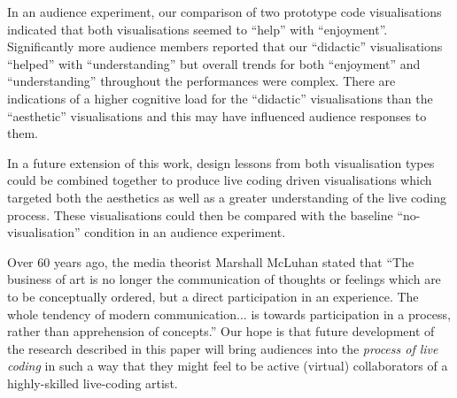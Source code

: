 \documentclass{sig-alternate}
\begin{document}
In an audience experiment, our comparison of two prototype code
visualisations indicated that both visualisations seemed to ``help''
with ``enjoyment''. Significantly more audience members reported that
our ``didactic'' visualisations ``helped'' with ``understanding'' but
overall trends for both ``enjoyment'' and ``understanding'' throughout
the performances were complex. There are indications of a higher
cognitive load for the ``didactic'' visualisations than the
``aesthetic'' visualisations and this may have influenced audience
responses to them.

In a future extension of this work, design lessons from both
visualisation types could be combined together to produce live coding
driven visualisations which targeted both the aesthetics as well as a
greater understanding of the live coding process. These visualisations
could then be compared with the baseline ``no-visualisation''
condition in an audience experiment.

Over 60 years ago, the media theorist Marshall McLuhan stated that
``The business of art is no longer the communication of thoughts or
feelings which are to be conceptually ordered, but a direct
participation in an experience. The whole tendency of modern
communication... is towards participation in a process, rather than
apprehension of concepts.'' \cite{McLuhan} Our hope is that future
development of the research described in this paper will bring
audiences into the \textit{process of live coding} in such a way that
they might feel to be active (virtual) collaborators of a
highly-skilled live-coding artist.


\end{document}
